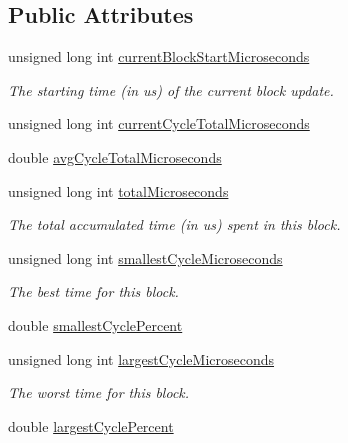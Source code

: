 \subsection*{Public Attributes}
\begin{CompactItemize}
\item 
unsigned long int \hyperlink{struct_j_g_t_l_1_1_profile_block_49aa3dc0ecd58718ecccdb23ff8ca4f5}{current\-Block\-Start\-Microseconds}
\begin{CompactList}\small\item\em The starting time (in us) of the current block update. \item\end{CompactList}\item 
unsigned long int \hyperlink{struct_j_g_t_l_1_1_profile_block_4dbffcbbb50e7e6affc6116f361a2417}{current\-Cycle\-Total\-Microseconds}
\item 
double \hyperlink{struct_j_g_t_l_1_1_profile_block_d995e3d70a098db440f9002aef727d40}{avg\-Cycle\-Total\-Microseconds}
\item 
unsigned long int \hyperlink{struct_j_g_t_l_1_1_profile_block_457aeecf869359baed544fa467d46b42}{total\-Microseconds}
\begin{CompactList}\small\item\em The total accumulated time (in us) spent in this block. \item\end{CompactList}\item 
unsigned long int \hyperlink{struct_j_g_t_l_1_1_profile_block_8edab8046fbb65df2c8bef07c638829b}{smallest\-Cycle\-Microseconds}
\begin{CompactList}\small\item\em The best time for this block. \item\end{CompactList}\item 
double \hyperlink{struct_j_g_t_l_1_1_profile_block_75a7c8c6d211c681097adf60c797c56e}{smallest\-Cycle\-Percent}
\item 
unsigned long int \hyperlink{struct_j_g_t_l_1_1_profile_block_6dc09e684472a23ea795a39d3c113977}{largest\-Cycle\-Microseconds}
\begin{CompactList}\small\item\em The worst time for this block. \item\end{CompactList}\item 
double \hyperlink{struct_j_g_t_l_1_1_profile_block_15d4a484adfda90c368bbacdf680d99c}{largest\-Cycle\-Percent}
\end{CompactItemize}



